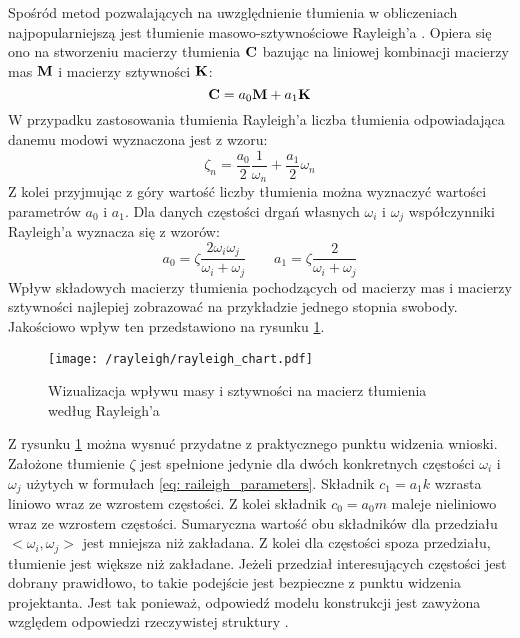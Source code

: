 Spośród metod pozwalających na uwzględnienie tłumienia w obliczeniach najpopularniejszą jest tłumienie masowo-sztywnościowe Rayleigh'a \parencite{Chopra2012a}. Opiera się ono na stworzeniu macierzy tłumienia $\mathbf{C}$ bazując na liniowej kombinacji macierzy mas $\mathbf{M}$ i macierzy sztywności $\mathbf{K}$:
\begin{equation} \label{eq: rayleigh_damping}
	\mathbf{C}=a_0\mathbf{M}+a_1\mathbf{K}
\end{equation}
W przypadku zastosowania tłumienia Rayleigh'a liczba tłumienia odpowiadająca danemu modowi wyznaczona jest z wzoru:
\begin{equation} \label{eq: damping_rayleigh}
	\zeta_n = \frac{a_0}{2}\frac{1}{\omega_n} + \frac{a_1}{2}\omega_n
\end{equation}
Z kolei przyjmując z góry wartość liczby tłumienia można wyznaczyć wartości parametrów $a_0$ i $a_1$. Dla danych częstości drgań własnych $\omega_i$ i $\omega_j$ współczynniki Rayleigh'a wyznacza się z wzorów:
\begin{equation} \label{eq: raileigh_parameters}
	a_0 = \zeta\frac{2\omega_i\omega_j}{\omega_i+\omega_j} \qquad a_1 = \zeta\frac{2}{\omega_i+\omega_j}
\end{equation}
Wpływ składowych macierzy tłumienia pochodzących od macierzy mas i macierzy sztywności najlepiej zobrazować na przykładzie jednego stopnia swobody. Jakościowo wpływ ten przedstawiono na rysunku \ref{fig: rayleigh_chart}.
\begin{figure}[hbt!] 
	\centering
	\texttt{[image: /rayleigh/rayleigh\_chart.pdf]}
	\captionsetup{justification=centering}
	\caption{Wizualizacja wpływu masy i sztywności na macierz tłumienia według Rayleigh'a}
	\label{fig: rayleigh_chart}
\end{figure}
Z rysunku \ref{fig: rayleigh_chart} można wysnuć przydatne z praktycznego punktu widzenia wnioski. Założone tłumienie $\zeta$ jest spełnione jedynie dla dwóch konkretnych częstości $\omega_i$ i $\omega_j$ użytych w formułach \ref{eq: raileigh_parameters}. Składnik $c_1=a_1 k$ wzrasta liniowo wraz ze wzrostem częstości. Z kolei składnik $c_0 = a_0 m$ maleje nieliniowo wraz ze wzrostem częstości. Sumaryczna wartość obu składników dla przedziału $<\omega_i ,\omega_j>$ jest mniejsza niż zakładana. Z kolei dla częstości spoza przedziału, tłumienie jest większe niż zakładane. Jeżeli przedział interesujących częstości jest dobrany prawidłowo, to takie podejście jest bezpieczne z punktu widzenia projektanta. Jest tak ponieważ, odpowiedź modelu konstrukcji jest zawyżona względem odpowiedzi rzeczywistej struktury \parencite{Oleszek2015}.


